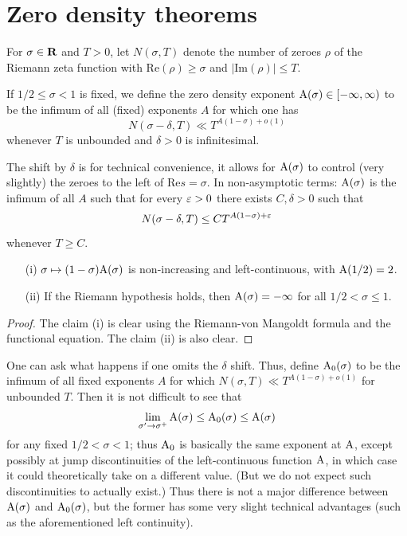 \chapter{Zero density theorems}\label{zero-density-chapter}

\begin{definition}\label{zero-def}  For $\sigma \in \mathbf{R}$ and $T>0$, let $N(\sigma,T)$ denote the number of zeroes $\rho$ of the Riemann zeta function with $\mathrm{Re}(\rho) \geq \sigma$ and $|\mathrm{Im}(\rho)| \leq T$.

If $1/2 \leq \sigma < 1$ is fixed, we define the zero density exponent $\mathrm{A}(\sigma) \in [-\infty,\infty)$ to be the infimum of all (fixed) exponents $A$ for which one has
    $$ N(\sigma-\delta,T) \ll T^{A (1-\sigma)+o(1)}$$
whenever $T$ is unbounded and $\delta>0$ is infinitesimal.
\end{definition}

The shift by $\delta$ is for technical convenience, it allows for $\mathrm{A}(\sigma)$ to control (very slightly) the zeroes to the left of $\mathrm{Re} s = \sigma$.  In non-asymptotic terms: $\mathrm{A}(\sigma)$ is the infimum of all $A$ such that for every $\varepsilon>0$ there exists $C, \delta > 0$ such that
$$ N(\sigma-\delta, T) \leq C T^{A(1-\sigma)+\varepsilon}$$
whenever $T \geq C$.

\begin{lemma}\label{zero-basic}
\begin{itemize}
\item[(i)] $\sigma \mapsto (1-\sigma) \mathrm{A}(\sigma)$ is non-increasing and left-continuous, with $\mathrm{A}(1/2)=2$.
\item[(ii)] If the Riemann hypothesis holds, then $\mathrm{A}(\sigma)=-\infty$ for all $1/2 < \sigma \leq 1$.
\end{itemize}
\end{lemma}

\begin{proof} The claim (i) is clear using the Riemann-von Mangoldt formula \cite[Theorem 1.7]{ivic} and the functional equation.  The claim (ii) is also clear.
\end{proof}

\begin{remark} One can ask what happens if one omits the $\delta$ shift.  Thus, define $\mathrm{A}_0(\sigma)$ to be the infimum of all fixed exponents $A$ for which  $N(\sigma,T) \ll T^{A (1-\sigma)+o(1)}$ for unbounded $T$. Then it is not difficult to see that
$$ \lim_{\sigma' \to \sigma^+} \mathrm{A}(\sigma) \leq \mathrm{A}_0(\sigma) \leq \mathrm{A}(\sigma)$$
for any fixed $1/2 < \sigma < 1$; thus $\mathrm{A}_0$ is basically the same exponent at $\mathrm{A}$, except possibly at jump discontinuities of the left-continuous function $\mathrm{A}$, in which case it could theoretically take on a different value.  (But we do not expect such discontinuities to actually exist.)  Thus there is not a major difference between $\mathrm{A}(\sigma)$ and $\mathrm{A}_0(\sigma)$, but the former has some very slight technical advantages (such as the aforementioned left continuity).
\end{remark}

